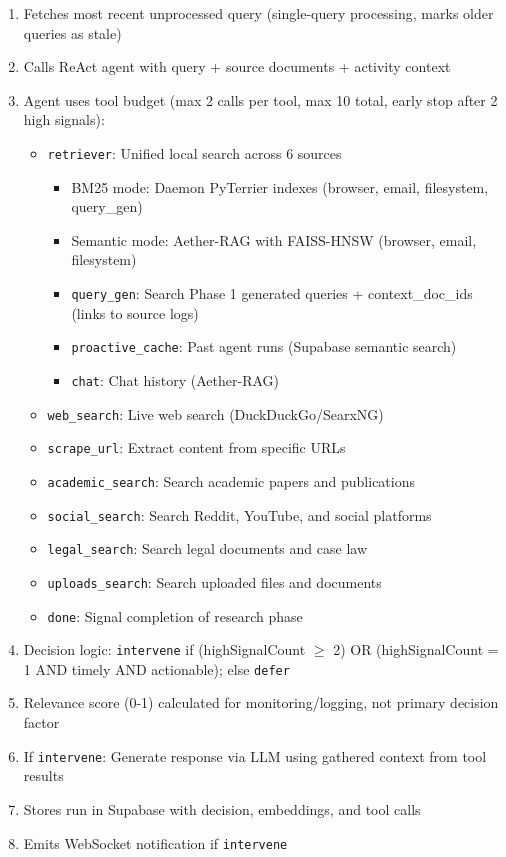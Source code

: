 \documentclass[11pt,a4paper]{article}
\begin{document}
\begin{enumerate}[leftmargin=*]
    \item Fetches most recent unprocessed query (single-query processing, marks older queries as stale)
    \item Calls ReAct agent with query + source documents + activity context
    \item Agent uses tool budget (max 2 calls per tool, max 10 total, early stop after 2 high signals):
    \begin{itemize}
        \item \texttt{retriever}: Unified local search across 6 sources
        \begin{itemize}
            \item BM25 mode: Daemon PyTerrier indexes (browser, email, filesystem, query\_gen)
            \item Semantic mode: Aether-RAG with FAISS-HNSW (browser, email, filesystem)
            \item \texttt{query\_gen}: Search Phase 1 generated queries + context\_doc\_ids (links to source logs)
            \item \texttt{proactive\_cache}: Past agent runs (Supabase semantic search)
            \item \texttt{chat}: Chat history (Aether-RAG)
        \end{itemize}
        \item \texttt{web\_search}: Live web search (DuckDuckGo/SearxNG)
        \item \texttt{scrape\_url}: Extract content from specific URLs
        \item \texttt{academic\_search}: Search academic papers and publications
        \item \texttt{social\_search}: Search Reddit, YouTube, and social platforms
        \item \texttt{legal\_search}: Search legal documents and case law
        \item \texttt{uploads\_search}: Search uploaded files and documents
        \item \texttt{done}: Signal completion of research phase
    \end{itemize}
    \item Decision logic: \texttt{intervene} if (highSignalCount $\geq$ 2) OR (highSignalCount = 1 AND timely AND actionable); else \texttt{defer}
    \item Relevance score (0-1) calculated for monitoring/logging, not primary decision factor
    \item If \texttt{intervene}: Generate response via LLM using gathered context from tool results
    \item Stores run in Supabase with decision, embeddings, and tool calls
    \item Emits WebSocket notification if \texttt{intervene}
\end{enumerate}
\end{document}
